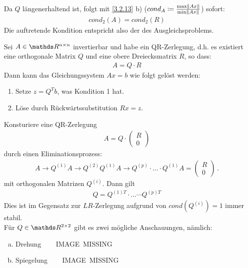 Da $Q$ längenerhaltend ist, folgt mit \ref{3.2.13} b)
($cond_A \coloneqq \frac{\max \left\| Ax \right\|}{\min \left\| Ax \right\|}$)
sofort:
\begin{gather*}
cond_2(A) = cond_2(R)
\end{gather*}
Die auftretende Kondition entspricht also der des Ausgleichsproblems.


\begin{Beme}
	Sei $A\in \Renn$ invertierbar und habe ein QR-Zerlegung, d.h. es existiert
	eine orthogonale Matrix $Q$ und eine obere Dreiecksmatrix $R$, so dass:
	\begin{gather*}
	A= Q\cdot R
	\end{gather*}
	Dann kann das Gleichungssystem $Ax=b$ wie folgt gelöst werden:
	\begin{enumerate}[1.]
		\item Setze $z=Q^Tb$, was Kondition 1 hat.
		\item Löse durch Rückwärtssubstitution $Rx=z$.
	\end{enumerate}
\end{Beme}



Konsturiere eine QR-Zerlegung
\begin{gather}
A= Q\cdot \begin{pmatrix} R\\0 \end{pmatrix}
\label{IV.4.1}
\end{gather}
durch einen Eliminationsprozess:
\begin{gather}
A \rightarrow Q^{(1)}A \rightarrow Q^{(2)} Q^{(1)}A \rightarrow Q^{(p)}\cdot \dotsc \cdot Q^{(1)}A
= \begin{pmatrix} R\\0 \end{pmatrix}\, .
\label{IV.4.2}
\end{gather}
mit orthogonalen Matrizen $Q^{(i)}$.
Dann gilt
\begin{gather}
Q= Q^{(1)T}\cdot \dotsc \cdots {Q^{(p)T}}
\label{IV.4.3}
\end{gather}
Dies ist im Gegensatz zur $LR$-Zerlegung aufgrund von $cond(Q^{(i)})= 1$ immer stabil.\\

Für $Q\in\R^{2\times 2}$ gibt es zwei mögliche Anschauungen, nämlich:
\begin{enumerate}[a)]
	\item Drehung ~~~ IMAGE~MISSING
	\item Spiegelung ~~~ IMAGE~MISSING
\end{enumerate}

